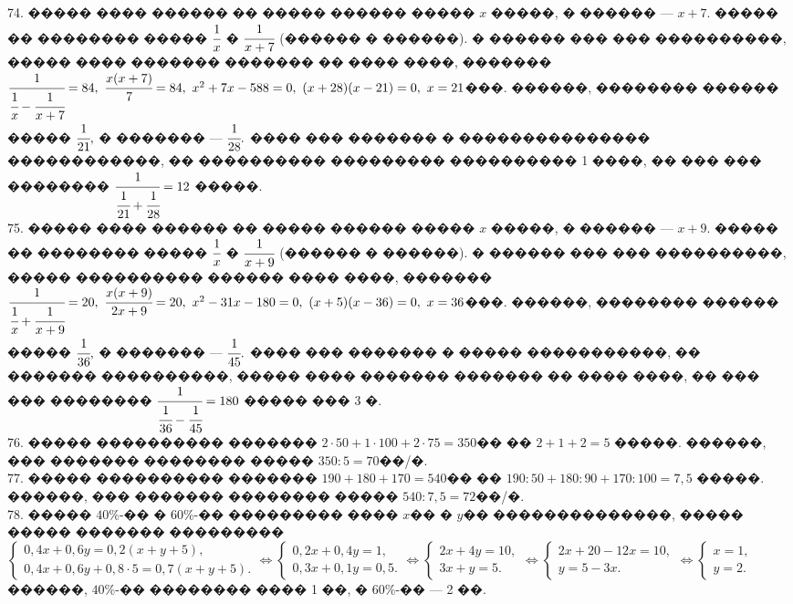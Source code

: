 \documentclass[12pt]{article}
\begin{document}
74. ����� ���� ������ �� ����� ������ ����� $x$ �����, � ������ --- $x+7.$ ����� �� �������� ����� $\cfrac{1}{x}$ � $\cfrac{1}{x+7}$ (������ � ������). � ������ ��� ��� ����������, ����� ���� ������� ������� �� ���� ����, ������� $\cfrac{1}{\cfrac{1}{x}-\cfrac{1}{x+7}}=84,\ \cfrac{x(x+7)}{7}=84,\
x^2+7x-588=0,\ (x+28)(x-21)=0,\ x=21$���. ������, �������� ������ ����� $\cfrac{1}{21},$ � ������� --- $\cfrac{1}{28}.$ ���� ��� ������� � ��������������� ������������, ��  ���������� ��������� ���������� 1 ����, �� ��� ��� �������� $\cfrac{1}{\cfrac{1}{21}+\cfrac{1}{28}}=12$ �����.\\
75. ����� ���� ������ �� ����� ������ ����� $x$ �����, � ������ --- $x+9.$ ����� �� �������� ����� $\cfrac{1}{x}$ � $\cfrac{1}{x+9}$ (������ � ������). � ������ ��� ��� ����������, ����� ���������� ������ ���� ����, ������� $\cfrac{1}{\cfrac{1}{x}+\cfrac{1}{x+9}}=20,\ \cfrac{x(x+9)}{2x+9}=20,\
x^2-31x-180=0,\ (x+5)(x-36)=0,\ x=36$���. ������, �������� ������ ����� $\cfrac{1}{36},$ � ������� --- $\cfrac{1}{45}.$ ���� ��� ������� � ����� �����������, �� ������� ����������, ����� ���� ������� ������� �� ���� ����, �� ��� ��� �������� $\cfrac{1}{\cfrac{1}{36}-\cfrac{1}{45}}=180$ ����� ��� 3 �.\\
76. ����� ���������� ������� $2\cdot50+1\cdot100+2\cdot75=350$�� �� $2+1+2=5$ �����. ������, ��� ������� �������� ����� $350:5=70$��/�.\\
77. ����� ���������� ������� $190+180+170=540$�� �� $190:50+180:90+170:100=7,5$ �����. ������, ��� ������� �������� ����� $540:7,5=72$��/�.\\
78. ����� $40\%$-�� � $60\%$-�� ��������� ���� $x$�� � $y$�� ��������������, ����� ����� ������� ��������� $\begin{cases}
0,4x+0,6y=0,2(x+y+5),\\ 0,4x+0,6y+0,8\cdot5=0,7(x+y+5).\end{cases}\Leftrightarrow\begin{cases}
0,2x+0,4y=1,\\ 0,3x+0,1y=0,5.\end{cases}\Leftrightarrow\begin{cases}
2x+4y=10,\\ 3x+y=5.\end{cases}\Leftrightarrow\begin{cases}
2x+20-12x=10,\\ y=5-3x.\end{cases}\Leftrightarrow\begin{cases}
x=1,\\ y=2.\end{cases}$ ������, $40\%$-�� �������� ���� 1 ��, � $60\%$-�� --- 2 ��.\\
\end{document}
